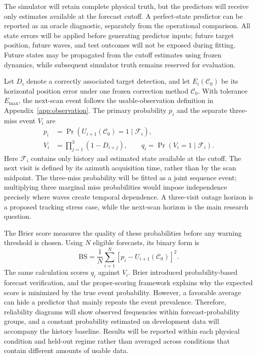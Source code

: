 \documentclass[10pt,letterpaper]{article}
\begin{document}
The simulator will retain complete physical truth, but the predictors will receive only estimates available at the forecast cutoff. A perfect-state predictor can be reported as an oracle diagnostic, separately from the operational comparison. All state errors will be applied before generating predictor inputs; future target position, future waves, and test outcomes will not be exposed during fitting. Future states may be propagated from the cutoff estimates using frozen dynamics, while subsequent simulator truth remains reserved for evaluation.

Let $D_i$ denote a correctly associated target detection, and let $E_i(\mathcal{C}_0)$ be its horizontal position error under one frozen correction method $\mathcal{C}_0$. With tolerance $E_{\max}$, the next-scan event follows the usable-observation definition in Appendix~\ref{app:observation}. The primary probability $p_i$ and the separate three-miss event $V_i$ are
\begin{equation}
\label{eq:forecast-events}
\begin{aligned}
p_i&=\Pr\!\left(U_{i+1}(\mathcal{C}_0)=1\mid\mathcal{F}_i\right),\\
V_i&=\prod_{j=1}^{3}(1-D_{i+j}),\qquad
q_i=\Pr(V_i=1\mid\mathcal{F}_i).
\end{aligned}
\end{equation}
Here $\mathcal{F}_i$ contains only history and estimated state available at the cutoff. The next visit is defined by its azimuth acquisition time, rather than by the scan midpoint. The three-miss probability will be fitted as a joint sequence event; multiplying three marginal miss probabilities would impose independence precisely where waves create temporal dependence. A three-visit outage horizon is a proposed tracking stress case, while the next-scan horizon is the main research question.

The Brier score measures the quality of these probabilities before any warning threshold is chosen. Using $N$ eligible forecasts, its binary form is
\begin{equation}
\label{eq:brier}
\mathrm{BS}=\frac{1}{N}\sum_{i=1}^{N}\left[p_i-U_{i+1}(\mathcal{C}_0)\right]^2.
\end{equation}
The same calculation scores $q_i$ against $V_i$. Brier introduced probability-based forecast verification, and the proper-scoring framework explains why the expected score is minimized by the true event probability. \cite{Brier1950Verification,Gneiting2007ProperScoring} However, a favorable average can hide a predictor that mainly repeats the event prevalence. Therefore, reliability diagrams will show observed frequencies within forecast-probability groups, and a constant probability estimated on development data will accompany the history baseline. Results will be reported within each physical condition and held-out regime rather than averaged across conditions that contain different amounts of usable data.
\end{document}
